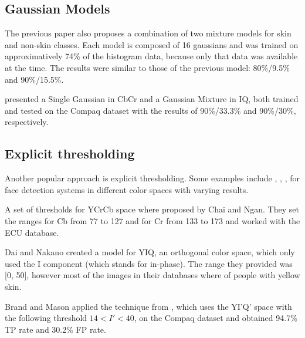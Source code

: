 \documentclass[12pt]{article}
\begin{document}
	\subsection{Gaussian Models}
	The previous paper \cite{compaq} also proposes a combination of two mixture models for skin and non-skin classes. Each model is composed of 16 gaussians and was trained on approximatively 74\% of the histogram data, because only that data was available at the time. The results were similar to those of the previous model: 80\%/9.5\% and 90\%/15.5\%.
	
	\cite{gaussian_applied} presented a Single Gaussian in CbCr and a Gaussian Mixture in IQ, both trained and tested on the Compaq dataset with the results of 90\%/33.3\% and 90\%/30\%, respectively.
	
	\subsection{Explicit thresholding}
	Another popular approach is explicit thresholding. Some examples include \cite{rgb_threshold}, \cite{cr_cb_threshold}, \cite{yiq_threshold}, \cite{i_threshold} for face detection systems in different color spaces with varying results. 
	
	A set of thresholds for YCrCb space where proposed by Chai and Ngan\cite{cr_cb_threshold}. They set the ranges for Cb from 77 to 127 and for Cr from 133 to 173 and worked with the ECU database.
	
	Dai and Nakano\cite{yiq_threshold} created a model for YIQ, an orthogonal color space, which only used the I component (which stands for in-phase). The range they provided was [0, 50], however most of the images in their databases where of people with yellow skin.
	
	Brand and Mason \cite{i_threshold_applied} applied the technique from \cite{i_threshold}, which uses the YI'Q' space with the following threshold \(14 < I' < 40\), on the Compaq dataset and obtained 94.7\% TP rate and 30.2\% FP rate.
	
\end{document}
